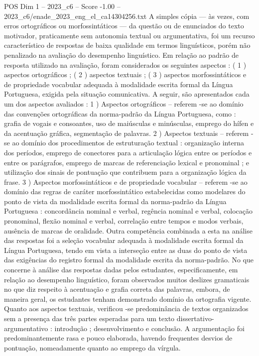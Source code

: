 \begin{textsample}{POS Dim 1 – 2023\_c6 – Score -1.00 – 2023\_c6/enade\_2023\_eng\_el\_ca14304256.txt}
A simples cópia — às vezes, com erros ortográficos ou morfossintáticos — da questão ou de enunciados do texto motivador, praticamente sem autonomia textual ou argumentativa, foi um recurso característico de respostas de baixa qualidade em termos linguísticos, porém não penalizado na avaliação do desempenho linguístico.
Em relação ao padrão de resposta utilizado na avaliação, foram considerados os seguintes aspectos : ( 1 ) aspectos ortográficos ; ( 2 ) aspectos textuais ; ( 3 ) aspectos morfossintáticos e de propriedade vocabular adequada à modalidade escrita formal da Língua Portuguesa, exigida pela situação comunicativa.
A seguir, são apresentados cada um dos aspectos avaliados : 1 ) Aspectos ortográficos – referem -se ao domínio das convenções ortográficas da norma-padrão da Língua Portuguesa, como : grafia de vogais e consoantes, uso de maiúsculas e minúsculas, emprego do hífen e da acentuação gráfica, segmentação de palavras. 2 ) Aspectos textuais – referem -se ao domínio dos procedimentos de estruturação textual : organização interna dos períodos, emprego de conectores para a articulação lógica entre os períodos e entre os parágrafos, emprego de marcas de referenciação lexical e pronominal ; e utilização dos sinais de pontuação que contribuem para a organização lógica da frase. 3 ) Aspectos morfossintáticos e de propriedade vocabular – referem -se ao domínio das regras de caráter morfossintático estabelecidas como modelares do ponto de vista da modalidade escrita formal da norma-padrão da Língua Portuguesa : concordância nominal e verbal, regência nominal e verbal, colocação pronominal, flexão nominal e verbal, correlação entre tempos e modos verbais, ausência de marcas de oralidade.
Outra competência combinada a esta na análise das respostas foi a seleção vocabular adequada à modalidade escrita formal da Língua Portuguesa, tendo em vista a interseção entre as duas do ponto de vista das exigências do registro formal da modalidade escrita da norma-padrão.
No que concerne à análise das respostas dadas pelos estudantes, especificamente, em relação ao desempenho linguístico, foram observados muitos deslizes gramaticais no que diz respeito à acentuação e grafia correta das palavras, embora, de maneira geral, os estudantes tenham demonstrado domínio da ortografia vigente.
Quanto aos aspectos textuais, verificou -se predominância de textos organizados sem a presença das três partes esperadas para um texto dissertativo-argumentativo : introdução ; desenvolvimento e conclusão.
A argumentação foi predominantemente rasa e pouco elaborada, havendo frequentes desvios de pontuação, nomeadamente quanto ao emprego da vírgula.

\end{textsample}
